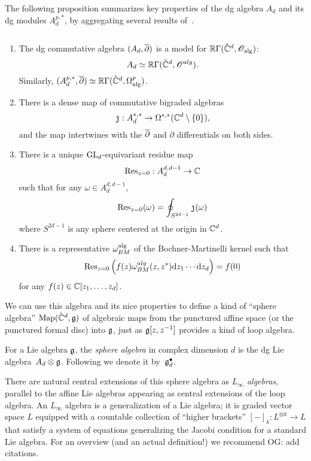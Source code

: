 \documentclass[11pt]{amsart}
\def\jou{{\mathtt{j}}}
\def\owen#1{{\textcolor{violet!65!black}{OG: {#1}}}}
\begin{document}
The following proposition summarizes key properties of the dg algebra $A_d$ and its dg modules $A_{d}^{p,*}$,
by aggregating several results of~\cite{FHK}.

\begin{prop}
\label{prop: Ad} $\;$
\begin{enumerate}
\item
The dg commutative algebra $(A_d,{\overline{\partial}})$ is a model for $\mathbb R \Gamma(\mathring{\mathbb C}^d, \mathscr O_{\rm alg})$:
\[
A_d \simeq \mathbb R\Gamma(\mathring{\mathbb C}^{d}, \mathscr O^{alg}) .
\]
Similarly, $(A_d^{p,*},{\overline{\partial}}) \simeq \mathbb R \Gamma(\mathring{\mathbb C}^{d}, \Omega^{p}_{\rm alg})$.
\item There is a dense map of commutative bigraded algebras
\[
\jou : A^{*,*}_d \to \Omega^{*,*}(\CC^d \setminus \{0\}),
\]
and the map intertwines with the ${\overline{\partial}}$ and $\partial$ differentials on both sides.
\item There is a unique ${\rm GL}_d$-equivariant residue map
\[
{\rm Res}_{z=0} : A_d^{d,d-1} \to \mathbb C
\]
such that for any $\omega \in A^{d,d-1}_d$,
\[
{\rm Res}_{z=0} (\omega) = \oint_{S^{2d-1}} \jou(\omega)
\]
where $S^{2d-1}$ is any sphere centered at the origin in $\mathbb C^d$. 
\item There is a representative $\omega_{BM}^{\rm alg}$ of the Bochner-Martinelli kernel such that
\[
{\rm Res}_{z=0} \left(f(z) \omega_{BM}^{alg}(z,z^*) {\rm d} z_1 \cdots {\rm d} z_d\right) = f(0)
\]
for any $f (z) \in \mathbb C[z_1,\ldots,z_d]$. 
\end{enumerate}
\end{prop}

We can use this algebra and its nice properties to define a kind of ``sphere algebra'' ${\rm Map}(\mathring{\mathbb C}^d,\mathfrak g)$ of algebraic maps from the punctured affine space (or the punctured formal disc) into $\mathfrak g$,
just as $\mathfrak g[z,z^{-1}]$ provides a kind of loop algebra.

\begin{dfn}
For a Lie algebra $\mathfrak g$, the {\em sphere algebra} in complex dimension $d$ is the dg Lie algebra~$A_d \otimes \mathfrak g$.
Following \cite{FHK} we denote it by~$\mathfrak g^\bullet_d$.
\end{dfn}

There are natural central extensions of this sphere algebra as {\em $L_\infty$ algebras},
parallel to the affine Lie algebras appearing as central extensions of the loop algebra.
An $L_\infty$ algebra is a generalization of a Lie algebra;
it is graded vector space $L$ equipped with a countable collection of ``higher brackets'' $[-]_k: L^{\otimes k} \to L$ that satisfy a system of equations generalizing the Jacobi condition for a standard Lie algebra.
For an overview (and an actual definition!) we recommend \owen{add citations}.
\end{document}
